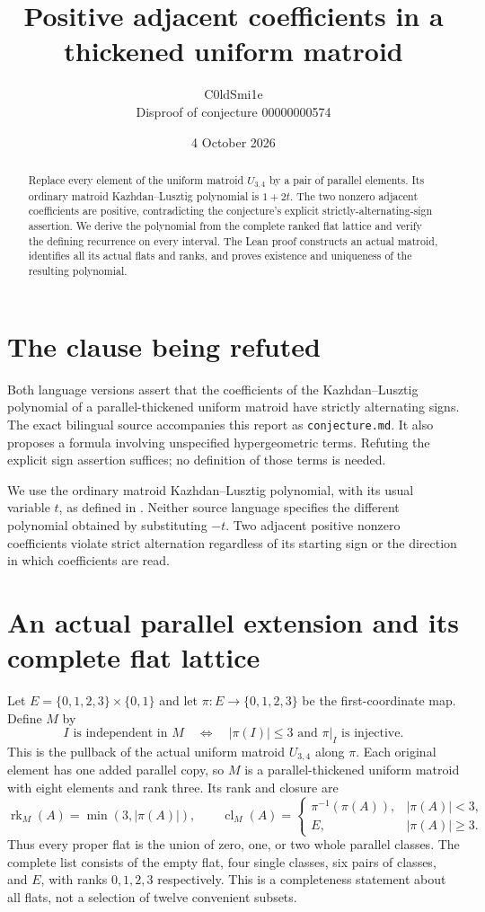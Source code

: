 \documentclass[10pt]{article}
\title{Positive adjacent coefficients in a thickened uniform matroid}
\author{C0ldSmi1e\\\small Disproof of conjecture 00000000574}
\date{4 October 2026}
\newcommand{\rk}{\operatorname{rk}}
\begin{document}
\maketitle
\begin{abstract}
Replace every element of the uniform matroid $U_{3,4}$ by a pair of parallel elements. Its ordinary matroid Kazhdan--Lusztig polynomial is $1+2t$. The two nonzero adjacent coefficients are positive, contradicting the conjecture's explicit strictly-alternating-sign assertion. We derive the polynomial from the complete ranked flat lattice and verify the defining recurrence on every interval. The Lean proof constructs an actual matroid, identifies all its actual flats and ranks, and proves existence and uniqueness of the resulting polynomial.
\end{abstract}

\section{The clause being refuted}
Both language versions assert that the coefficients of the Kazhdan--Lusztig polynomial of a parallel-thickened uniform matroid have strictly alternating signs. The exact bilingual source accompanies this report as \texttt{conjecture.md}. It also proposes a formula involving unspecified hypergeometric terms. Refuting the explicit sign assertion suffices; no definition of those terms is needed.

We use the ordinary matroid Kazhdan--Lusztig polynomial, with its usual variable $t$, as defined in \cite[Theorem 2.2]{epw}. Neither source language specifies the different polynomial obtained by substituting $-t$. Two adjacent positive nonzero coefficients violate strict alternation regardless of its starting sign or the direction in which coefficients are read.

\section{An actual parallel extension and its complete flat lattice}
Let $E=\{0,1,2,3\}\times\{0,1\}$ and let $\pi:E\to\{0,1,2,3\}$ be the first-coordinate map. Define $M$ by
\[
 I\text{ is independent in }M
 \quad\Longleftrightarrow\quad
 |\pi(I)|\le3\text{ and }\pi|_I\text{ is injective}.
\]
This is the pullback of the actual uniform matroid $U_{3,4}$ along $\pi$. Each original element has one added parallel copy, so $M$ is a parallel-thickened uniform matroid with eight elements and rank three. Its rank and closure are
\[
 \rk_M(A)=\min(3,|\pi(A)|),\qquad
 \operatorname{cl}_M(A)=
 \begin{cases}
 \pi^{-1}(\pi(A)),&|\pi(A)|<3,\\
 E,&|\pi(A)|\ge3.
 \end{cases}
\]
Thus every proper flat is the union of zero, one, or two whole parallel classes. The complete list consists of the empty flat, four single classes, six pairs of classes, and $E$, with ranks $0,1,2,3$ respectively. This is a completeness statement about all flats, not a selection of twelve convenient subsets.
\end{document}
